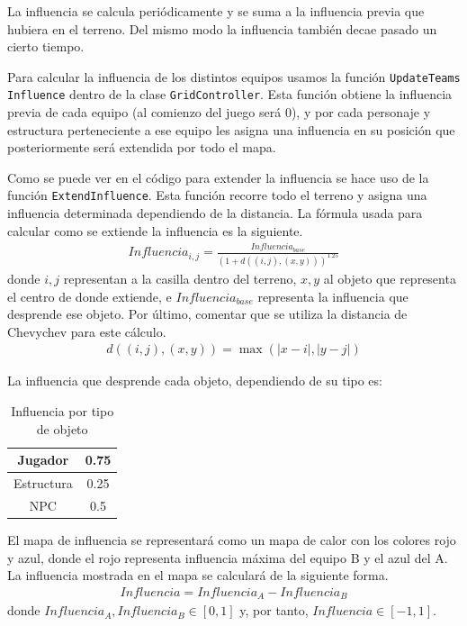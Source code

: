 La influencia se calcula periódicamente y se suma a la influencia previa que hubiera en el terreno. Del mismo modo la influencia también decae pasado un cierto tiempo.

Para calcular la influencia de los distintos equipos usamos la función \texttt{UpdateTeams Influence} dentro de la clase \texttt{GridController}. Esta función obtiene la influencia previa de cada equipo (al comienzo del juego será 0), y por cada personaje y estructura perteneciente a ese equipo les asigna una influencia en su posición que posteriormente será extendida por todo el mapa.

 

Como se puede ver en el código para extender la influencia se hace uso de la función \texttt{ExtendInfluence}. Esta función recorre todo el terreno y asigna una influencia determinada dependiendo de la distancia. La fórmula usada para calcular como se extiende la influencia es la siguiente.
\begin{gather*}
    Influencia_{i,j} = \frac{Influencia_{base}}{\left(1 + d\left((i,j), (x,y)\right)\right)^{1.25}}
\end{gather*}
donde $i,j$ representan a la casilla dentro del terreno, $x,y$ al objeto que representa el centro de donde extiende, e $Influencia_{base}$ representa la influencia que desprende ese objeto. Por último, comentar que se utiliza la distancia de Chevychev para este cálculo.
\begin{gather*}
    d\left((i,j), (x,y)\right) = \max \left( \lvert x - i \rvert, \lvert y - j \rvert \right)
\end{gather*}

La influencia que desprende cada objeto, dependiendo de su tipo es:

\begin{table}[H]
    \centering
    \begin{tabular}{|c|c|}
        \hline
        Jugador & 0.75 \\
        \hline
        Estructura & 0.25 \\
        \hline
        NPC & 0.5 \\
        \hline
    \end{tabular}
    \caption{Influencia por tipo de objeto}
    \label{tab:influencepertype}
\end{table}

El mapa de influencia se representará como un mapa de calor con los colores rojo y azul, donde el rojo representa influencia máxima del equipo B y el azul del A. La influencia mostrada en el mapa se calculará de la siguiente forma.
\begin{gather*}
    Influencia = Influencia_A - Influencia_B
\end{gather*}
donde $Influencia_A, Influencia_B \in [0,1]$ y, por tanto, $Influencia \in [-1, 1]$.


